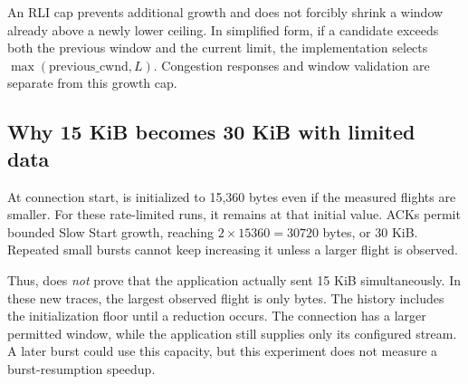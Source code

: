 \documentclass[11pt,a4paper]{article}
\newcommand{\code}[1]{\texttt{\detokenize{#1}}}
\begin{document}
An RLI cap prevents additional growth and does not forcibly shrink a
window already above a newly lower ceiling. In simplified form, if a
candidate exceeds both the previous window and the current limit, the
implementation selects \(\max(\mathrm{previous\_cwnd},L)\). Congestion
responses and window validation are separate from this growth cap.

\subsection{Why 15 KiB becomes 30 KiB with limited data}
At connection start, \code{maxFS} is initialized to 15,360 bytes even if
the measured flights are smaller. For these rate-limited runs, it remains
at that initial value. ACKs permit bounded Slow Start growth, reaching
\(2\times 15360=30720\) bytes, or 30 KiB. Repeated small bursts cannot
keep increasing it unless a larger flight is observed.

Thus, \code{maxFS = 15 KiB} does \emph{not} prove that the application
actually sent 15 KiB simultaneously. In these new traces, the largest
observed flight is only \ObservedRateFlight{} bytes. The history includes the initialization floor
until a reduction occurs. The connection has a larger permitted window,
while the application still supplies only its configured stream. A later
burst could use this capacity, but this experiment does not measure a
burst-resumption speedup.
\end{document}
